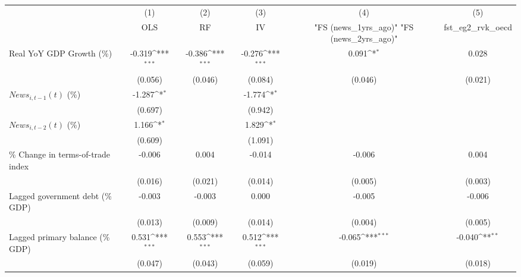{
\def\sym#1{\ifmmode^{#1}\else\(^{#1}\)\fi}
\begin{tabular}{l*{5}{c}}
\toprule
                    &\multicolumn{1}{c}{(1)}&\multicolumn{1}{c}{(2)}&\multicolumn{1}{c}{(3)}&\multicolumn{1}{c}{(4)}&\multicolumn{1}{c}{(5)}\\
                    &\multicolumn{1}{c}{OLS}&\multicolumn{1}{c}{RF}&\multicolumn{1}{c}{IV}&\multicolumn{1}{c}{ "FS (news_1yrs_ago)"  "FS (news_2yrs_ago)" }&\multicolumn{1}{c}{fst_eg2_rvk_oecd}\\
\midrule
Real YoY GDP Growth (\%)&      -0.319\sym{***}&      -0.386\sym{***}&      -0.276\sym{***}&       0.091\sym{*}  &       0.028         \\
                    &     (0.056)         &     (0.046)         &     (0.084)         &     (0.046)         &     (0.021)         \\
\addlinespace
$ News_{i,t-1}(t)$ (\%)&      -1.287\sym{*}  &                     &      -1.774\sym{*}  &                     &                     \\
                    &     (0.697)         &                     &     (0.942)         &                     &                     \\
\addlinespace
$ News_{i,t-2}(t)$ (\%)&       1.166\sym{*}  &                     &       1.829\sym{*}  &                     &                     \\
                    &     (0.609)         &                     &     (1.091)         &                     &                     \\
\addlinespace
\% Change in terms-of-trade index&      -0.006         &       0.004         &      -0.014         &      -0.006         &       0.004         \\
                    &     (0.016)         &     (0.021)         &     (0.014)         &     (0.005)         &     (0.003)         \\
\addlinespace
Lagged government debt (\% GDP)&      -0.003         &      -0.003         &       0.000         &      -0.005         &      -0.006         \\
                    &     (0.013)         &     (0.009)         &     (0.014)         &     (0.004)         &     (0.005)         \\
\addlinespace
Lagged primary balance (\% GDP)&       0.531\sym{***}&       0.553\sym{***}&       0.512\sym{***}&      -0.065\sym{***}&      -0.040\sym{**} \\
                    &     (0.047)         &     (0.043)         &     (0.059)         &     (0.019)         &     (0.018)         \\

\end{tabular}}
